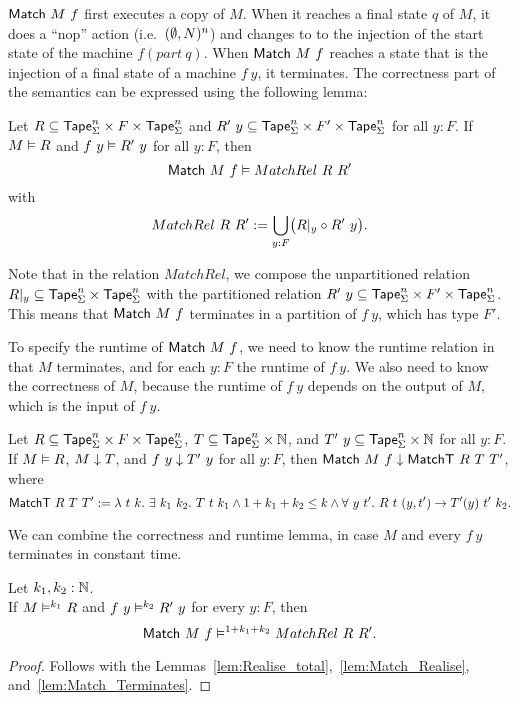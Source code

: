 $\mathsf{Match}~M~f$ first executes a copy of $M$.  When it reaches a final state $q$ of $M$, it does a ``nop'' action (i.e.\ $(\emptyset,N)^n$) and changes
to to the injection of the start state of the machine $f(part~q)$.  When $\mathsf{Match}~M~f$ reaches a state that is the injection of a final state of
a machine $f~y$, it terminates.  The correctness part of the semantics can be expressed using the following lemma:

\begin{lemma}
  \label{lem:Match_Realise}
  Let $R \subseteq \mathsf{Tape}_\Sigma^n \times F \times \mathsf{Tape}_\Sigma^n$ and $R'~y \subseteq \mathsf{Tape}_\Sigma^n \times F' \times \mathsf{Tape}_\Sigma^n$ for all $y:F$.
  If $M \mathrel{\vDash} R$ and $f~y \mathrel{\vDash} R'~y$ for all $y:F$, then
  \[
    \mathsf{Match}~M~f \mathrel{\vDash} MatchRel~R~R'
  \]
  with
  \[
    MatchRel~R~R' := \bigcup_{y:F} \bigl( R{|}_{y} \circ R'~y \bigr).
  \]
\end{lemma}

Note that in the relation $MatchRel$, we compose the unpartitioned relation $R {|}_{y} \subseteq \mathsf{Tape}_\Sigma^n \times \mathsf{Tape}_\Sigma^n$ with the
partitioned relation $R'~y \subseteq \mathsf{Tape}_\Sigma^n \times F' \times \mathsf{Tape}_\Sigma^n$.  This means that $\mathsf{Match}~M~f$ terminates in a partition of
$f~y$, which has type $F'$.

To specify the runtime of $\mathsf{Match}~M~f$, we need to know the runtime relation in that $M$ terminates, and for each $y:F$ the runtime of $f~y$.
We also need to know the correctness of $M$, because the runtime of $f~y$ depends on the output of $M$, which is the input of $f~y$.

\begin{lemma}
  \label{lem:Match_Terminates}
  Let $R \subseteq \mathsf{Tape}_\Sigma^n \times F \times \mathsf{Tape}_\Sigma^n$, $T \subseteq \mathsf{Tape}_\Sigma^n \times \mathbb{N}$, and
  $T'~y \subseteq \mathsf{Tape}_\Sigma^n \times \mathbb{N}$ for all $y:F$.  If $M \mathrel{\vDash} R$, $M \mathrel{\downarrow} T$, and $f~y \mathrel{\downarrow} T'~y$ for all $y:F$, then
  $\mathsf{Match}~M~f \mathrel{\downarrow} \mathsf{MatchT}~R~T~T'$, where
  \[
    \mathsf{MatchT}~R~T~T' :=
    \lambda~t~k.~ \exists~k_1~k_2.~T~t~k_1 \land 1+k_1+k_2 \le k \land
      \forall~y~t'.~ R~t~(y,t') \rightarrow T'(y)~t'~k_2.
  \]
\end{lemma}

We can combine the correctness and runtime lemma, in case $M$ and every $f~y$ terminates in constant time.
\begin{lemma}
  \label{lem:Match_RealiseIn}
  Let $k_1, k_2:\mathbb{N}$.\\
  If $M \mathrel{\vDash^{k_1}} R$ and $f~y \mathrel{\vDash^{k_2}} R'~y$ for every $y:F$, then
  \[ \mathsf{Match}~M~f \mathrel{\vDash^{1+k_1+k_2}} MatchRel~R~R'. \]
\end{lemma}
\begin{proof}
  Follows with the Lemmas~\ref{lem:Realise_total},~\ref{lem:Match_Realise}, and~\ref{lem:Match_Terminates}.
\end{proof}


